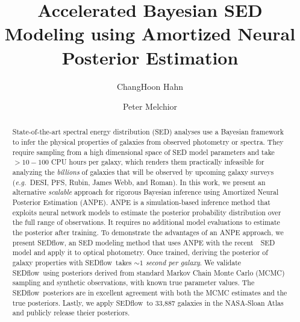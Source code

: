 \documentclass[12pt, letterpaper, preprint, comicneue]{aastex63}
\newcommand{\eg}{\emph{e.g.}}
\newcommand{\sedflow}{{\sc SEDflow}}
\begin{document}
 \sloppy\sloppypar\frenchspacing 

\title{Accelerated Bayesian SED Modeling using Amortized Neural Posterior Estimation}

\author[0000-0003-1197-0902]{ChangHoon Hahn}

\author[0000-0002-8873-5065]{Peter Melchior}

\begin{abstract}
    State-of-the-art spectral energy distribution (SED) analyses use a
    Bayesian framework to infer the physical properties of galaxies from
    observed photometry or spectra.
    They require sampling from a high dimensional space of SED model parameters
    and take $>10-100$ CPU hours per galaxy, which renders them practically
    infeasible for analyzing the {\em billions} of galaxies that will be
    observed by upcoming galaxy surveys
    (\eg~DESI, PFS, Rubin, James Webb, and Roman). 
    In this work, we present an alternative \emph{scalable} approach for
    rigorous Bayesian inference using Amortized Neural Posterior
    Estimation (ANPE). 
    ANPE is a simulation-based inference method that exploits neural network
    models to estimate the posterior probability distribution over the full
    range of observations.
    It requires no additional model evaluations to estimate the posterior after
    training. 
    To demonstrate the advantages of an ANPE approach, we present \sedflow, an
    SED modeling method that uses ANPE with the recent~\cite{hahn2022}~SED model 
    and apply it to optical photometry. 
    Once trained, deriving the posterior of galaxy properties with 
    \sedflow~takes \emph{${\sim}1$ second per galaxy}. 
    We validate \sedflow~using posteriors derived from standard
    Markov Chain Monte Carlo (MCMC) sampling and synthetic observations, with
    known true parameter values.  
    The \sedflow~posteriors are in excellent agreement with both the MCMC
    estimates and the true posteriors. 
    Lastly, we apply \sedflow~to 33,887 galaxies in the NASA-Sloan Atlas and
    publicly release theier posteriors.
\end{abstract}
\end{document}
